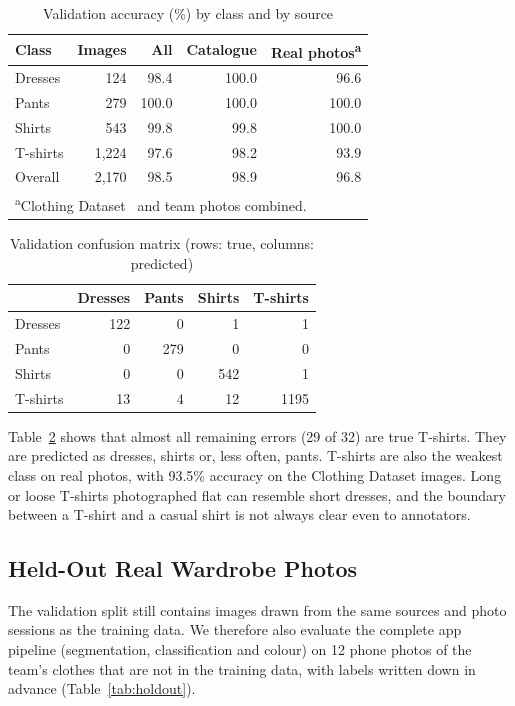 \documentclass[conference]{IEEEtran}
\begin{document}
\begin{table}[t]
\caption{Validation accuracy (\%) by class and by source}
\label{tab:val}
\centering
\begin{tabular}{lrrrr}
\toprule
Class & Images & All & Catalogue & Real photos\textsuperscript{a} \\
\midrule
Dresses & 124 & 98.4 & 100.0 & 96.6 \\
Pants & 279 & 100.0 & 100.0 & 100.0 \\
Shirts & 543 & 99.8 & 99.8 & 100.0 \\
T-shirts & 1{,}224 & 97.6 & 98.2 & 93.9 \\
\midrule
Overall & 2{,}170 & 98.5 & 98.9 & 96.8 \\
\bottomrule
\multicolumn{5}{l}{\footnotesize \textsuperscript{a}Clothing Dataset~\cite{grigorev2020clothing} and team photos combined.}
\end{tabular}
\end{table}

\begin{table}[t]
\caption{Validation confusion matrix (rows: true, columns: predicted)}
\label{tab:confusion}
\centering
\begin{tabular}{lrrrr}
\toprule
 & Dresses & Pants & Shirts & T-shirts \\
\midrule
Dresses & 122 & 0 & 1 & 1 \\
Pants & 0 & 279 & 0 & 0 \\
Shirts & 0 & 0 & 542 & 1 \\
T-shirts & 13 & 4 & 12 & 1195 \\
\bottomrule
\end{tabular}
\end{table}

Table~\ref{tab:confusion} shows that almost all remaining errors (29 of 32) are true T-shirts. They are predicted as dresses, shirts or, less often, pants. T-shirts are also the weakest class on real photos, with 93.5\% accuracy on the Clothing Dataset images. Long or loose T-shirts photographed flat can resemble short dresses, and the boundary between a T-shirt and a casual shirt is not always clear even to annotators.

\subsection{Held-Out Real Wardrobe Photos}
The validation split still contains images drawn from the same sources and photo sessions as the training data. We therefore also evaluate the complete app pipeline (segmentation, classification and colour) on 12 phone photos of the team's clothes that are not in the training data, with labels written down in advance (Table~\ref{tab:holdout}).
\end{document}
